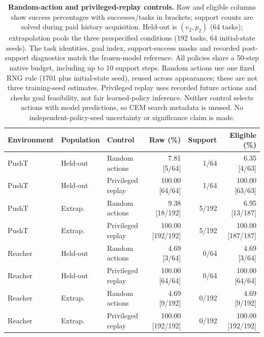 \begin{table}[t]\centering\footnotesize
\setlength{\tabcolsep}{3.5pt}\renewcommand{\arraystretch}{1.1}
\begin{tabular}{lllrrr}\toprule
Environment & Population & Control & Raw (\%) & Support & Eligible (\%)\\\midrule
PushT & Held-out & Random actions & 7.81 [5/64] & 1/64 & 6.35 [4/63]\\
PushT & Held-out & Privileged replay & 100.00 [64/64] & 1/64 & 100.00 [63/63]\\
PushT & Extrap. & Random actions & 9.38 [18/192] & 5/192 & 6.95 [13/187]\\
PushT & Extrap. & Privileged replay & 100.00 [192/192] & 5/192 & 100.00 [187/187]\\
Reacher & Held-out & Random actions & 4.69 [3/64] & 0/64 & 4.69 [3/64]\\
Reacher & Held-out & Privileged replay & 100.00 [64/64] & 0/64 & 100.00 [64/64]\\
Reacher & Extrap. & Random actions & 4.69 [9/192] & 0/192 & 4.69 [9/192]\\
Reacher & Extrap. & Privileged replay & 100.00 [192/192] & 0/192 & 100.00 [192/192]\\
\bottomrule\end{tabular}
\caption{\textbf{Random-action and privileged-replay controls.} Raw and eligible columns show success percentages with successes/tasks in brackets; support counts are solved during paid history acquisition. Held-out is $(v_2,p_2)$ (64 tasks); extrapolation pools the three prespecified conditions (192 tasks, 64 initial-state seeds). The task identities, goal index, support-success masks and recorded post-support diagnostics match the frozen-model reference. All policies share a 50-step native budget, including up to 10 support steps. Random actions use one fixed RNG rule (1701 plus initial-state seed), reused across appearances; these are not three training-seed estimates. Privileged replay uses recorded future actions and checks goal feasibility, not fair learned-policy inference. Neither control selects actions with model predictions, so CEM search metadata is unused. No independent-policy-seed uncertainty or significance claim is made.}
\label{tab:planning-controls}\end{table}
